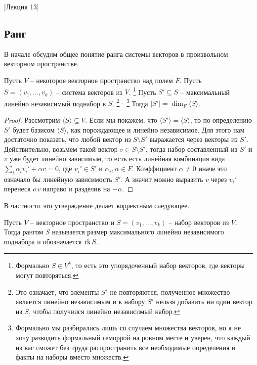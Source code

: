 [Лекция 13]


\subsection{Ранг}

В начале обсудим общее понятие ранга системы векторов в произвольном векторном пространстве.

\begin{claim}
Пусть $V$ -- некоторое векторное пространство над полем $F$.
Пусть $S = (v_1,\ldots,v_k) $ -- система векторов из $V$.%
\footnote{Формально $S\in V^k$, то есть это упорядоченный набор векторов, где векторы могут повторяться.}
Пусть $S'\subseteq S$ -- максимальный линейно независимый поднабор в $S$.%
\footnote{Это означает, что элементы $S'$ не повторяются, полученное множество является линейно независимым и к набору $S'$ нельзя добавить ни один вектор из $S$, чтобы получился линейно независимый набор.}%
${}^{,\,}$%
\footnote{Формально мы разбирались лишь со случаем множества векторов, но я не хочу разводить формальный геморрой на ровном месте и уверен, что каждый из вас сможет без труда распространить все необходимые определения и факты на наборы вместо множеств.}
Тогда $|S'| = \dim_F \langle S\rangle$.
\end{claim}
\begin{proof}
Рассмотрим $\langle S \rangle\subseteq V$.
Если мы покажем, что $\langle S' \rangle = \langle S \rangle$, то по определению $S'$ будет базисом $\langle S\rangle$, как порождающее и линейно независимое.
Для этого нам достаточно показать, что любой вектор из $S\setminus S'$ выражается через векторы из $S'$.
Действительно, возьмем такой вектор $v\in S\setminus S'$, тогда набор составленный из $S'$ и $v$ уже будет линейно зависимым, то есть есть линейная комбинация вида $\sum_i\alpha_i v_i' + \alpha v = 0$, где  $v_i'\in S'$ и $\alpha_i,\alpha\in F$.
Коэффициент $\alpha\neq 0$ иначе это означало бы линейную зависимость $S'$.
А значит можно выразить $v$ через $v_i'$ перенеся $\alpha v $ направо и разделив на $-\alpha$.
\end{proof}

В частности это утверждение делает корректным следующее.

\begin{definition}
Пусть $V$ -- векторное пространство и $S = (v_1,\ldots,v_k)$ -- набор векторов из $V$.
Тогда рангом $S$ называется размер максимального линейно независимого поднабора и обозначается $\operatorname{rk} S$.
\end{definition}

